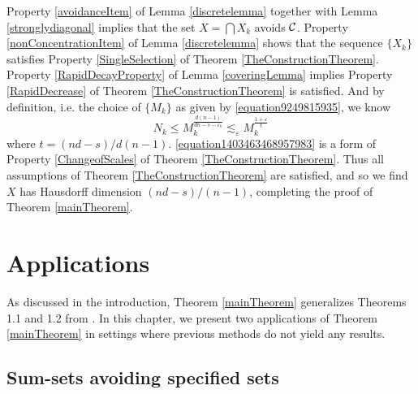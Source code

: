 Property \ref{avoidanceItem} of Lemma \ref{discretelemma} together with Lemma \ref{stronglydiagonal} implies that the set $X = \bigcap X_k$ avoids $\operatorname{\mathcal{C}}$. Property \ref{nonConcentrationItem} of Lemma \ref{discretelemma} shows that the sequence $\{ X_k \}$ satisfies Property \ref{SingleSelection} of Theorem \ref{TheConstructionTheorem}. Property \ref{RapidDecayProperty} of Lemma \ref{coveringLemma} implies Property \ref{RapidDecrease} of Theorem \ref{TheConstructionTheorem} is satisfied. And by definition, i.e. the choice of $\{ M_k \}$ as given by \eqref{equation9249815935}, we know
%
\begin{equation} \label{equation1403463468957983} N_k \leq M_k^{\frac{d(n-1)}{dn - s - \varepsilon_k}} \lesssim_\varepsilon M_k^{\frac{1 + \varepsilon}{t}} \end{equation}
%
where $t = (nd - s)/d(n-1)$. \eqref{equation1403463468957983} is a form of Property \ref{ChangeofScales} of Theorem \ref{TheConstructionTheorem}. Thus all assumptions of Theorem \ref{TheConstructionTheorem} are satisfied, and so we find $X$ has Hausdorff dimension $(nd - s)/(n-1)$, completing the proof of Theorem \ref{mainTheorem}.










\chapter{Applications} \label{ch:Applications}

As discussed in the introduction, Theorem \ref{mainTheorem} generalizes Theorems 1.1 and 1.2 from \cite{MalabikaRob}. In this chapter, we present two applications of Theorem \ref{mainTheorem} in settings where previous methods do not yield any results.

\section{Sum-sets avoiding specified sets}

